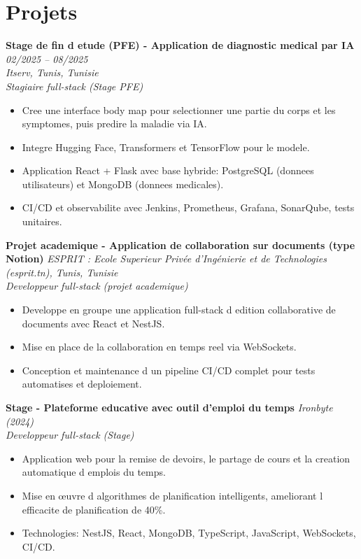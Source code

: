 \documentclass[11pt,a4paper]{article}
\begin{document}
\section*{Projets}
\textbf{Stage de fin d etude (PFE) - Application de diagnostic medical par IA} \hfill \textit{02/2025 -- 08/2025}\\
\textit{Itserv, Tunis, Tunisie}\\
\textit{Stagiaire full-stack (Stage PFE)}
\begin{itemize}[leftmargin=12pt,itemsep=2pt]
  \item Cree une interface body map pour selectionner une partie du corps et les symptomes, puis predire la maladie via IA.
  \item Integre Hugging Face, Transformers et TensorFlow pour le modele.
  \item Application React + Flask avec base hybride: PostgreSQL (donnees utilisateurs) et MongoDB (donnees medicales).
  \item CI/CD et observabilite avec Jenkins, Prometheus, Grafana, SonarQube, tests unitaires.
\end{itemize}

\textbf{Projet academique - Application de collaboration sur documents (type Notion)} \hfill \textit{ESPRIT : Ecole Superieur Privée d'Ingénierie et de Technologies (esprit.tn), Tunis, Tunisie}\\
\textit{Developpeur full-stack (projet academique)}
\begin{itemize}[leftmargin=12pt,itemsep=2pt]
  \item Developpe en groupe une application full-stack d edition collaborative de documents avec React et NestJS.
  \item Mise en place de la collaboration en temps reel via WebSockets.
  \item Conception et maintenance d un pipeline CI/CD complet pour tests automatises et deploiement.
\end{itemize}

\textbf{Stage - Plateforme educative avec outil d'emploi du temps} \hfill \textit{Ironbyte (2024)}\\
\textit{Developpeur full-stack (Stage)}
\begin{itemize}[leftmargin=12pt,itemsep=2pt]
  \item Application web pour la remise de devoirs, le partage de cours et la creation automatique d emplois du temps.
  \item Mise en œuvre d algorithmes de planification intelligents, ameliorant l efficacite de planification de 40\%.
  \item Technologies: NestJS, React, MongoDB, TypeScript, JavaScript, WebSockets, CI/CD.
\end{itemize}
\end{document}
